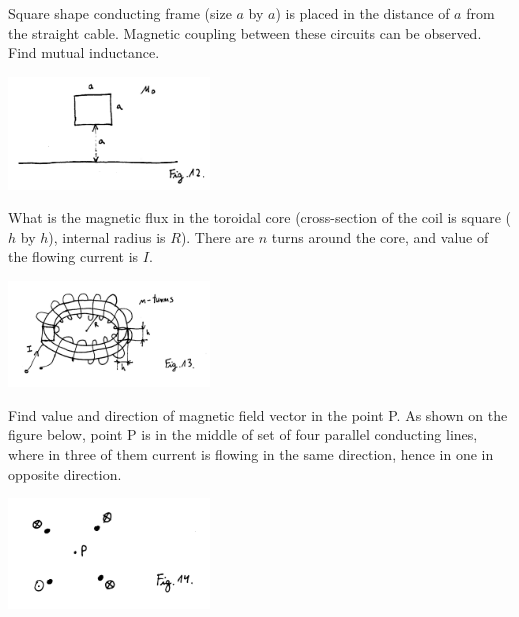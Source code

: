 \begin{Exercise}[difficulty=3]
Square shape conducting frame (size $a$ by $a$) is placed in the distance of $a$ from the straight cable. Magnetic coupling between these circuits can be observed. Find mutual inductance. 
\begin{center}
\includegraphics[width=0.4\textwidth]{img/fig_m4.png} 
\end{center}
\end{Exercise}

\begin{Exercise}[difficulty=3]
What is the magnetic flux in the toroidal core (cross-section of the coil is square ($h$ by $h$), internal radius is $R$). There are $n$ turns around the core, and value of the flowing current is $I$.
\begin{center}
\includegraphics[width=0.4\textwidth]{img/fig_m5.png} 
\end{center}
\end{Exercise}

\begin{Exercise}[difficulty=2]
Find value and direction of magnetic field vector in the point P. As shown on the figure below, point P is in the middle of set of four parallel conducting lines, where in three of them current is flowing in the same direction, hence in one in opposite direction.
\begin{center}
\includegraphics[width=0.4\textwidth]{img/fig_m6.png} 
\end{center}
\end{Exercise}



